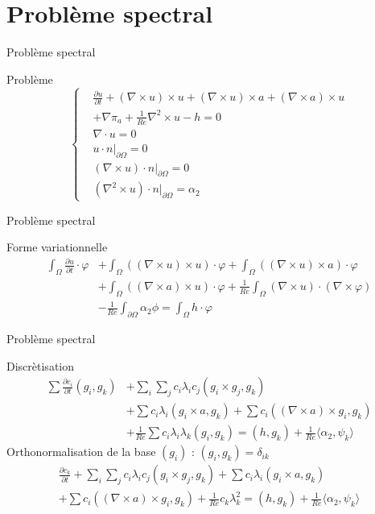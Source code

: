 \documentclass{beamer}
\newcommand{\grad}{{\nabla}}
\newcommand{\rot}{{\nabla\times}}
\newcommand{\rott}{{\nabla^2\times}}
\newcommand{\diverg}{{\nabla\cdot}}
\newcommand{\restr}{{\big\rvert_{\partial\Omega}}}
\begin{document}
\section{Problème spectral}
\begin{frame}{Problème spectral}
\begin{block}{Problème}
\[
\left\{
\begin{aligned}
&\frac{\partial u}{\partial t} + (\rot u)\times u + (\rot u)\times a + \left(\rot a\right)\times u \\
&+ \grad\pi_a + \frac{1}{Re}\rott u - h = 0\\
&\diverg u = 0\\
&u\cdot n\restr = 0\\
&(\rot u)\cdot n\restr = 0\\
&(\rott u)\cdot n\restr = \alpha_2
\end{aligned}
\right.
\]
\end{block}
\end{frame}

\begin{frame}{Problème spectral}
\begin{block}{Forme variationnelle}
\begin{align*}
\int_\Omega \frac{\partial u}{\partial t}\cdot \varphi &+ \int_\Omega ((\rot u)\times u)\cdot \varphi + \int_\Omega ((\rot u)\times a)\cdot\varphi \\
&+ \int_\Omega ((\rot a)\times u)\cdot\varphi + \frac{1}{Re}\int_\Omega (\rot u)\cdot(\rot\varphi) \\
&-\frac{1}{Re}\int_{\partial\Omega} \alpha_2\phi = \int_\Omega h\cdot\varphi
\end{align*}
\end{block}
\end{frame}

\begin{frame}{Problème spectral}
\begin{block}{Discrètisation}
\begin{align*}
\sum \frac{\partial c_i}{\partial t}(g_i,g_k) &+ \sum_i\sum_j c_i\lambda_i c_j(g_i\times g_j, g_k) \\
&+ \sum c_i\lambda_i(g_i\times a,g_k) + \sum c_i((\rot a)\times g_i, g_k) \\
&+ \frac{1}{Re}\sum c_i\lambda_i\lambda_k(g_i,g_k) = (h,g_k) + \frac{1}{Re}\langle\alpha_2,\psi_k\rangle
\end{align*}
Orthonormalisation de la base $(g_i)$ : $(g_i,g_k)=\delta_{ik}$
\begin{eqnarray*}
\frac{\partial c_k}{\partial t} + \sum_i\sum_j c_i\lambda_i c_j(g_i\times g_j, g_k) + \sum c_i\lambda_i(g_i\times a,g_k)\\
+ \sum c_i((\rot a)\times g_i, g_k) + \frac{1}{Re}c_k\lambda_k^2 = (h,g_k) + \frac{1}{Re}\langle\alpha_2,\psi_k\rangle
\end{eqnarray*}
\end{block}
\end{frame}
\end{document}
